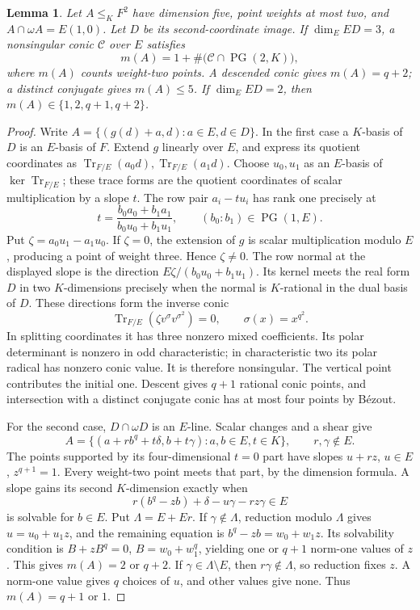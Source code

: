 \documentclass[12pt,letterpaper,onecolumn]{article}
\newtheorem{lemma}[theorem]{Lemma}
\theoremstyle{definition}
\theoremstyle{remark}
\DeclareMathOperator{\Tr}{Tr}
\DeclareMathOperator{\PG}{PG}
\begin{document}
\begin{lemma}\label{lem:core-local-conic}
Let \(A\le_KF^2\) have dimension five, point weights at most two, and \(A\cap\omega A=E(1,0)\).
Let \(D\) be its second-coordinate image.
If \(\dim_EED=3\), a nonsingular conic \(\mathcal C\) over \(E\) satisfies
\[
m(A)=1+\#\bigl(\mathcal C\cap\PG(2,K)\bigr),
\]
where \(m(A)\) counts weight-two points.
A descended conic gives \(m(A)=q+2\); a distinct conjugate gives \(m(A)\le5\).
If \(\dim_EED=2\), then \(m(A)\in\{1,2,q+1,q+2\}\).
\end{lemma}
\begin{proof}
Write \(A=\{(g(d)+a,d):a\in E,d\in D\}\).
In the first case a \(K\)-basis of \(D\) is an \(E\)-basis of \(F\).
Extend \(g\) linearly over \(E\), and express its quotient coordinates as
\(\Tr_{F/E}(a_0d),\Tr_{F/E}(a_1d)\).
Choose \(u_0,u_1\) as an \(E\)-basis of \(\ker\Tr_{F/E}\); these trace forms are the quotient coordinates of scalar multiplication by a slope \(t\).
The row pair \(a_i-tu_i\) has rank one precisely at
\[
t=\frac{b_0a_0+b_1a_1}{b_0u_0+b_1u_1},
\qquad(b_0:b_1)\in\PG(1,E).
\]
Put \(\zeta=a_0u_1-a_1u_0\).
If \(\zeta=0\), the extension of \(g\) is scalar multiplication modulo \(E\), producing a point of weight three. Hence \(\zeta\ne0\).
The row normal at the displayed slope is the direction
\(E\zeta/(b_0u_0+b_1u_1)\).
Its kernel meets the real form \(D\) in two \(K\)-dimensions precisely when the normal is \(K\)-rational in the dual basis of \(D\).
These directions form the inverse conic
\[
\Tr_{F/E}(\zeta v^\sigma v^{\sigma^2})=0,
\qquad \sigma(x)=x^{q^2}.
\]
In splitting coordinates it has three nonzero mixed coefficients.
Its polar determinant is nonzero in odd characteristic; in characteristic two its polar radical has nonzero conic value. It is therefore nonsingular.
The vertical point contributes the initial one.
Descent gives \(q+1\) rational conic points, and intersection with a distinct conjugate conic has at most four points by B\'ezout.

For the second case, \(D\cap\omega D\) is an \(E\)-line.
Scalar changes and a shear give
\[
A=\{(a+rb^q+t\delta,b+t\gamma):a,b\in E,t\in K\},
\qquad r,\gamma\notin E.
\]
The points supported by its four-dimensional \(t=0\) part have slopes
\(u+rz\), \(u\in E\), \(z^{q+1}=1\).
Every weight-two point meets that part, by the dimension formula.
A slope gains its second \(K\)-dimension exactly when
\[
r(b^q-zb)+\delta-u\gamma-rz\gamma\in E
\]
is solvable for \(b\in E\).
Put \(\Lambda=E+Er\).
If \(\gamma\notin\Lambda\), reduction modulo \(\Lambda\) gives \(u=u_0+u_1z\), and the remaining equation is
\(b^q-zb=w_0+w_1z\).
Its solvability condition is \(B+zB^q=0\), \(B=w_0+w_1^q\), yielding one or \(q+1\) norm-one values of \(z\).
This gives \(m(A)=2\) or \(q+2\).
If \(\gamma\in\Lambda\setminus E\), then \(r\gamma\notin\Lambda\), so reduction fixes \(z\).
A norm-one value gives \(q\) choices of \(u\), and other values give none. Thus \(m(A)=q+1\) or \(1\).
\end{proof}
\end{document}
